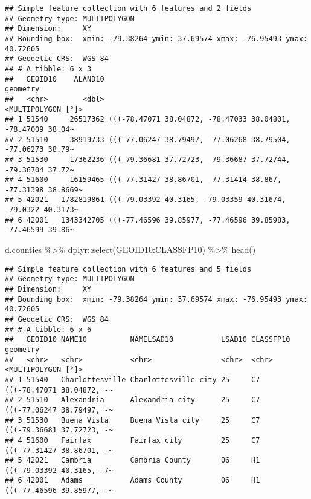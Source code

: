 \documentclass[
]{article}
\newenvironment{Shaded}{\begin{snugshade}}{\end{snugshade}}
\newcommand{\FunctionTok}[1]{\textcolor[rgb]{0.00,0.00,0.00}{#1}}
\newcommand{\NormalTok}[1]{#1}
\newcommand{\SpecialCharTok}[1]{\textcolor[rgb]{0.00,0.00,0.00}{#1}}
\begin{document}
\begin{verbatim}
## Simple feature collection with 6 features and 2 fields
## Geometry type: MULTIPOLYGON
## Dimension:     XY
## Bounding box:  xmin: -79.38264 ymin: 37.69574 xmax: -76.95493 ymax: 40.72605
## Geodetic CRS:  WGS 84
## # A tibble: 6 x 3
##   GEOID10    ALAND10                                                    geometry
##   <chr>        <dbl>                                          <MULTIPOLYGON [°]>
## 1 51540     26517362 (((-78.47071 38.04872, -78.47033 38.04801, -78.47009 38.04~
## 2 51510     38919733 (((-77.06247 38.79497, -77.06268 38.79504, -77.06273 38.79~
## 3 51530     17362236 (((-79.36681 37.72723, -79.36687 37.72744, -79.36704 37.72~
## 4 51600     16159465 (((-77.31427 38.86701, -77.31414 38.867, -77.31398 38.8669~
## 5 42021   1782819861 (((-79.03392 40.3165, -79.03359 40.31674, -79.0322 40.3173~
## 6 42001   1343342705 (((-77.46596 39.85977, -77.46596 39.85983, -77.46599 39.86~
\end{verbatim}

\begin{Shaded}
\begin{Highlighting}[]
\NormalTok{d.counties }\SpecialCharTok{\%\textgreater{}\%}\NormalTok{ dplyr}\SpecialCharTok{::}\FunctionTok{select}\NormalTok{(GEOID10}\SpecialCharTok{:}\NormalTok{CLASSFP10) }\SpecialCharTok{\%\textgreater{}\%} \FunctionTok{head}\NormalTok{()}
\end{Highlighting}
\end{Shaded}

\begin{verbatim}
## Simple feature collection with 6 features and 5 fields
## Geometry type: MULTIPOLYGON
## Dimension:     XY
## Bounding box:  xmin: -79.38264 ymin: 37.69574 xmax: -76.95493 ymax: 40.72605
## Geodetic CRS:  WGS 84
## # A tibble: 6 x 6
##   GEOID10 NAME10          NAMELSAD10           LSAD10 CLASSFP10                  geometry
##   <chr>   <chr>           <chr>                <chr>  <chr>            <MULTIPOLYGON [°]>
## 1 51540   Charlottesville Charlottesville city 25     C7        (((-78.47071 38.04872, -~
## 2 51510   Alexandria      Alexandria city      25     C7        (((-77.06247 38.79497, -~
## 3 51530   Buena Vista     Buena Vista city     25     C7        (((-79.36681 37.72723, -~
## 4 51600   Fairfax         Fairfax city         25     C7        (((-77.31427 38.86701, -~
## 5 42021   Cambria         Cambria County       06     H1        (((-79.03392 40.3165, -7~
## 6 42001   Adams           Adams County         06     H1        (((-77.46596 39.85977, -~
\end{verbatim}
\end{document}
